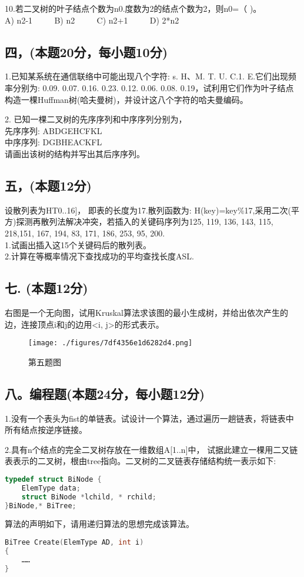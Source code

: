 10.若二叉树的叶子结点个数为n0.度数为2的结点个数为2，则n0=（ )。 \\
A) n2-1 $\qquad$ B) n2 $\qquad$ C) n2+1 $\qquad$ D) 2*n2

\subsection{四，(本题20分，每小题10分)}

1.已知某系统在通信联络中可能出现八个字符: s. H、M. T. U. C.1. E.它们出现频率分别为: 0.09. 0.07. 0.16. 0.23. 0.12. 0.06. 0.08. 0.19，试利用它们作为叶子结点构造一棵Huffman树(哈夫曼树)，并设计这八个字符的哈夫曼编码。

2. 已知一棵二叉树的先序序列和中序序列分别为， \\
先序序列: ABDGEHCFKL \\
中序序列: DGBHEACKFL \\
请画出该树的结构并写出其后序序列。

\subsection{五，(本题12分)}
设散列表为HT0..16]， 即表的长度为17.散列函数为: H(key)=key\%17,采用二次(平方)探测再散列法解决冲突，若插入的关键码序列为{125, 119, 136, 143, 115, 218,151, 167, 194, 83, 171, 186, 253, 95, 200}. \\
1.试画出插入这15个关键码后的散列表。 \\
2.计算在等概率情况下查找成功的平均查找长度ASL.

\subsection{七. (本题12分)}
右图是一个无向图，试用Kruskal算法求该图的最小生成树，并给出依次产生的边，连接顶点i和j的边用<i, j>的形式表示。
\begin{figure}[ht]
\centering
\texttt{[image: ./figures/7df4356e1d6282d4.png]}
\caption{第五题图} \label{fig_SMDS12_1}
\end{figure}

\subsection{八。编程题(本题24分，每小题12分)}

1.没有一个表头为fist的单链表。试设计一个算法，通过遍历一趟链表，将链表中所有结点按逆序链接。

2.具有n个结点的完全二叉树存放在一维数组A[1..n]中， 试据此建立一棵用二又链表表示的二叉树，根由tree指向。二叉树的二叉链表存储结构统一表示如下:
\begin{lstlisting}[language=cpp]
typedef struct BiNode {
    ElemType data;
    struct BiNode *lchild, * rchild;
}BiNode,* BiTree;
\end{lstlisting}
算法的声明如下，请用递归算法的思想完成该算法。
\begin{lstlisting}[language=cpp]
BiTree Create(ElemType AD, int i)
{
    ……
}
\end{lstlisting}

